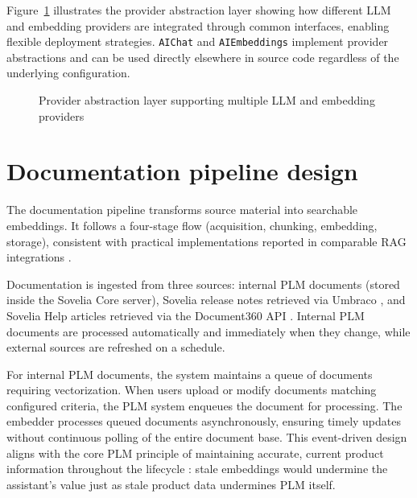 Figure~\ref{fig:provider-abstraction} illustrates the provider abstraction layer showing how different LLM and embedding providers are integrated through common interfaces, enabling flexible deployment strategies. \texttt{AIChat} and \texttt{AIEmbeddings} implement provider abstractions and can be used directly elsewhere in source code regardless of the underlying configuration.

\begin{figure}[htbp]
    \centering
    \small{\resizebox{0.9\textwidth}{!}{}}
    \caption{Provider abstraction layer supporting multiple LLM and embedding providers}
    \label{fig:provider-abstraction}
\end{figure}

\section{Documentation pipeline design}
\label{sec:documentation-pipeline-design}

The documentation pipeline transforms source material into searchable embeddings. It follows a four-stage flow (acquisition, chunking, embedding, storage), consistent with practical implementations reported in comparable RAG integrations \parencite{herediaalvaroAdvancedRetrievalaugmentedGeneration2025, shejutiExtendedAbstractEnhancing2025}.

Documentation is ingested from three sources: internal PLM documents (stored inside the Sovelia Core server), Sovelia release notes retrieved via Umbraco \parencite{UmbracoCMSDocumentation2025, ReleaseNewsAll}, and Sovelia Help articles retrieved via the Document360 API \parencite{Document360API, SoveliaHelp}. Internal PLM documents are processed automatically and immediately when they change, while external sources are refreshed on a schedule.

For internal PLM documents, the system maintains a queue of documents requiring vectorization. When users upload or modify documents matching configured criteria, the PLM system enqueues the document for processing. The embedder processes queued documents asynchronously, ensuring timely updates without continuous polling of the entire document base. This event-driven design aligns with the core PLM principle of maintaining accurate, current product information throughout the lifecycle \parencite{starkProductLifecycleManagement2015}: stale embeddings would undermine the assistant's value just as stale product data undermines PLM itself.

